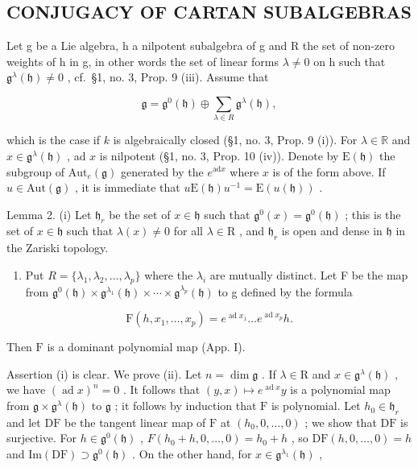 \subsection{CONJUGACY OF CARTAN SUBALGEBRAS}

Let g be a Lie algebra, h a nilpotent subalgebra of g and R the set of non-zero weights of h in g, in other words the set of linear forms \(\lambda \neq 0\) on h such that \(\mathfrak{g}^{\lambda}(\mathfrak{h}) \neq 0\) , cf.~§1, no. 3, Prop. 9 (iii). Assume that

\[
\mathfrak {g} = \mathfrak {g} ^ {0} (\mathfrak {h}) \oplus \sum_ {\lambda \in R} \mathfrak {g} ^ {\lambda} (\mathfrak {h}),
\]

which is the case if \(k\) is algebraically closed (§1, no. 3, Prop. 9 (i)). For \(\lambda \in \mathbb{R}\) and \(x \in \mathfrak{g}^{\lambda}(\mathfrak{h})\) , ad \(x\) is nilpotent (§1, no. 3, Prop. 10 (iv)). Denote by \(\mathrm{E}(\mathfrak{h})\) the subgroup of \(\mathrm{Aut}_e(\mathfrak{g})\) generated by the \(e^{\mathrm{ad}x}\) where \(x\) is of the form above. If \(u \in \mathrm{Aut}(\mathfrak{g})\) , it is immediate that \(u\mathrm{E}(\mathfrak{h})u^{-1} = \mathrm{E}(u(\mathfrak{h}))\) .

Lemma 2. (i) Let \(\mathfrak{h}_r\) be the set of \(x\in \mathfrak{h}\) such that \(\mathfrak{g}^0 (x) = \mathfrak{g}^0 (\mathfrak{h})\) ; this is the set of \(x\in \mathfrak{h}\) such that \(\lambda (x)\neq 0\) for all \(\lambda \in \mathrm{R}\) , and \(\mathfrak{h}_r\) is open and dense in \(\mathfrak{h}\) in the Zariski topology.

\begin{enumerate}
\def\labelenumi{(\roman{enumi})}
\setcounter{enumi}{1}
\tightlist
\item
  Put \(R = \{\lambda_{1}, \lambda_{2}, \ldots, \lambda_{p}\}\) where the \(\lambda_{i}\) are mutually distinct. Let F be the map from \(\mathfrak{g}^{0}(\mathfrak{h}) \times \mathfrak{g}^{\lambda_{1}}(\mathfrak{h}) \times \cdots \times \mathfrak{g}^{\lambda_{p}}(\mathfrak{h})\) to g defined by the formula
\end{enumerate}

\[
\mathrm{F} (h, x _ {1}, \dots , x _ {p}) = e ^ {\operatorname{ad} x _ {1}} \dots e ^ {\operatorname{ad} x _ {p}} h.
\]

Then \(\mathrm{F}\) is a dominant polynomial map (App. I).

Assertion (i) is clear. We prove (ii). Let \(n = \dim \mathfrak{g}\) . If \(\lambda \in \mathrm{R}\) and \(x \in \mathfrak{g}^{\lambda}(\mathfrak{h})\) , we have \((\operatorname{ad} x)^n = 0\) . It follows that \((y, x) \mapsto e^{\operatorname{ad} x} y\) is a polynomial map from \(\mathfrak{g} \times \mathfrak{g}^{\lambda}(\mathfrak{h})\) to \(\mathfrak{g}\) ; it follows by induction that \(\mathrm{F}\) is polynomial. Let \(h_0 \in \mathfrak{h}_r\) and let \(\mathrm{DF}\) be the tangent linear map of \(\mathrm{F}\) at \((h_0, 0, \ldots, 0)\) ; we show that \(\mathrm{DF}\) is surjective. For \(h \in \mathfrak{g}^{0}(\mathfrak{h})\) , \(F(h_{0} + h, 0, \ldots, 0) = h_{0} + h\) , so \(\mathrm{DF}(h, 0, \ldots, 0) = h\) and \(\mathrm{Im}(\mathrm{DF}) \supset \mathfrak{g}^{0}(\mathfrak{h})\) . On the other hand, for \(x \in \mathfrak{g}^{\lambda_{1}}(\mathfrak{h})\) ,

